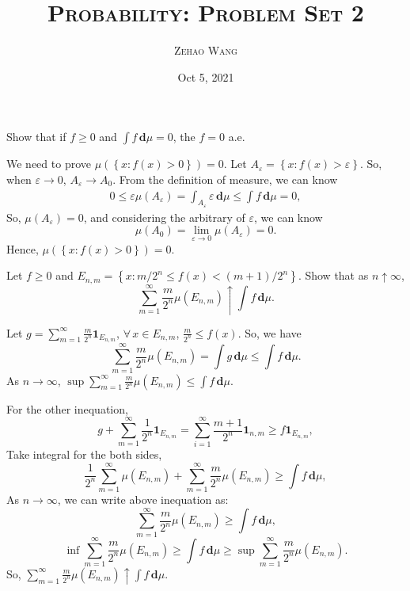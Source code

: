 \documentclass[en, normal, 11pt, black]{elegantnote}
\title{\textsc{Probability: Problem Set 2}}
\author{\textsc{Zehao Wang}}
\date{Oct 5, 2021}
\newenvironment{exercise}[1]{\begin{tcolorbox}[colback=black!15, colframe=black!80, breakable, title=#1]}{\end{tcolorbox}}
\renewenvironment{proof}{\begin{tcolorbox}[colback=white, colframe=black!50, breakable, title=Proof. ]\setlength{\parskip}{0.8em}}{\\\rightline{$\square$}\end{tcolorbox}}
\newcommand{\der}{\,\mathbf{d}}
\begin{document}
\maketitle
    \begin{exercise}{1.4.1}
        Show that if $f\geqslant0$ and $\int f\der \mu=0$, the $f=0$ a.e. 
    \end{exercise}

    \begin{proof}
        We need to prove $\mu\left(\left\{x:f(x)>0\right\}\right)=0$. Let $A_\varepsilon=\left\{x:f(x)>\varepsilon\right\}$. So, when $\varepsilon\to0$, $A_\varepsilon\to A_0$. 
        From the definition of measure, we can know
        \begin{align*}
            0\leqslant\varepsilon\mu(A_\varepsilon)=\int_{A_\varepsilon}\varepsilon\der\mu\leqslant\int f\der\mu=0, 
        \end{align*}
        So, $\mu(A_\varepsilon)=0$, and considering the arbitrary of $\varepsilon$, we can know
        \[\mu(A_0)=\lim_{\varepsilon\to0}\mu(A_\varepsilon)=0. \]
        Hence,  $\mu\left(\left\{x:f(x)>0\right\}\right)=0$. 
    \end{proof}


    \begin{exercise}{1.4.2}
        Let $f \geq 0$ and $E_{n, m}=\left\{x: m / 2^{n} \leqslant f(x)<(m+1) / 2^{n}\right\}$. Show that as $n \uparrow \infty$, 
        \[
            \sum_{m=1}^{\infty} \frac{m}{2^{n}} \mu\left(E_{n, m}\right) \uparrow \int f \der \mu. 
        \]
    \end{exercise}

    \begin{proof}
        Let $g=\sum_{m=1}^\infty\frac{m}{2^n}\mathbf{1}_{E_{n,m}}$, $\forall\,x\in E_{n,m}$, $\frac{m}{2^n}\leqslant f(x)$. So, we have 
        \[
            \sum_{m=1}^\infty\frac{m}{2^n}\mu(E_{n,m})=\int g\der \mu\leqslant\int f\der \mu. 
        \]
        As $n\to\infty$, $\sup \sum_{m=1}^\infty\frac{m}{2^n}\mu(E_{n,m})\leqslant \int f\der \mu$. 

        For the other inequation, 
        \[
            g+\sum_{m=1}^\infty \frac{1}{2^n}\mathbf{1}_{E_{n,m}}=\sum_{i=1}^\infty\frac{m+1}{2^n}\mathbf{1}_{n,m}\geqslant f\mathbf{1}_{E_{n,m}}, 
        \]
        Take integral for the both sides, 
        \[
            \frac{1}{2^n}\sum_{m=1}^\infty\mu(E_{n,m})+\sum_{m=1}^\infty\frac{m}{2^n}\mu(E_{n,m})\geqslant\int f\der\mu, 
        \]
        As $n\to \infty$, we can write above inequation as: 
        \[
            \sum_{m=1}^\infty\frac{m}{2^n}\mu(E_{n,m})\geqslant\int f\der\mu, 
        \]
        \[
            \inf \sum_{m=1}^\infty\frac{m}{2^n}\mu(E_{n,m})\geqslant\int f\der\mu\geqslant\sup \sum_{m=1}^\infty\frac{m}{2^n}\mu(E_{n,m}). 
        \]
        So, $\sum_{m=1}^{\infty} \frac{m}{2^{n}} \mu\left(E_{n, m}\right) \uparrow \int f \der \mu$. 
    \end{proof}
\end{document}
